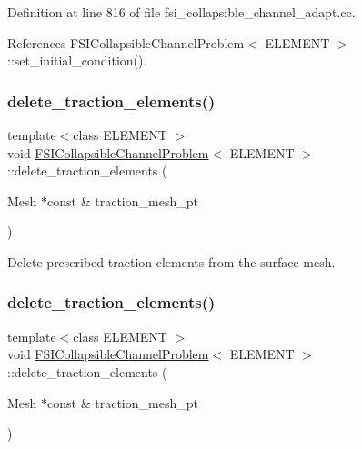 Definition at line 816 of file fsi\+\_\+collapsible\+\_\+channel\+\_\+adapt.\+cc.



References F\+S\+I\+Collapsible\+Channel\+Problem$<$ E\+L\+E\+M\+E\+N\+T $>$\+::set\+\_\+initial\+\_\+condition().

\mbox{\label{classFSICollapsibleChannelProblem_af1848415423aa824b91357922905a18f}} 
\subsubsection{\texorpdfstring{delete\+\_\+traction\+\_\+elements()}{delete\_traction\_elements()}\hspace{0.1cm}{\footnotesize\ttfamily [2/3]}}
{\footnotesize\ttfamily template$<$class E\+L\+E\+M\+E\+NT $>$ \\
void \hyperlink{classFSICollapsibleChannelProblem}{F\+S\+I\+Collapsible\+Channel\+Problem}$<$ E\+L\+E\+M\+E\+NT $>$\+::delete\+\_\+traction\+\_\+elements (\begin{DoxyParamCaption}\item[{Mesh $\ast$const \&}]{traction\+\_\+mesh\+\_\+pt }\end{DoxyParamCaption})\hspace{0.3cm}{\ttfamily [private]}}



Delete prescribed traction elements from the surface mesh. 

\mbox{\label{classFSICollapsibleChannelProblem_af1848415423aa824b91357922905a18f}} 
\subsubsection{\texorpdfstring{delete\+\_\+traction\+\_\+elements()}{delete\_traction\_elements()}\hspace{0.1cm}{\footnotesize\ttfamily [3/3]}}
{\footnotesize\ttfamily template$<$class E\+L\+E\+M\+E\+NT $>$ \\
void \hyperlink{classFSICollapsibleChannelProblem}{F\+S\+I\+Collapsible\+Channel\+Problem}$<$ E\+L\+E\+M\+E\+NT $>$\+::delete\+\_\+traction\+\_\+elements (\begin{DoxyParamCaption}\item[{Mesh $\ast$const \&}]{traction\+\_\+mesh\+\_\+pt }\end{DoxyParamCaption})\hspace{0.3cm}{\ttfamily [private]}}



